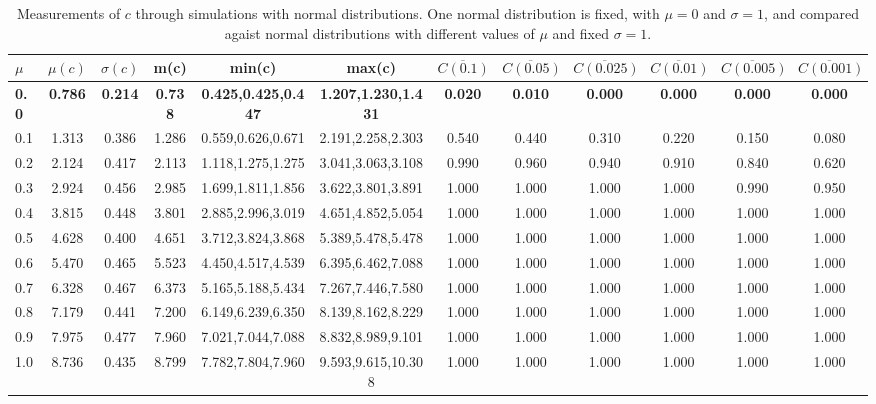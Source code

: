 \begin{table*}[h!]
\begin{center}
\begin{tabular}{| l | c | c | c | c | c | c | c | c | c | c | c |}\hline
$\mu$ & $\mu(c)$ & $\sigma(c)$ & m(c) & min(c) & max(c) & $\overline{C(0.1)}$ & $\overline{C(0.05)}$ & $\overline{C(0.025)}$ & $\overline{C(0.01)}$ & $\overline{C(0.005)}$ & $\overline{C(0.001)}$ \\\hline\hline
{\bf 0.0} & {\bf 0.786} & {\bf 0.214} & {\bf 0.738} & {\bf 0.425,0.425,0.447} & {\bf 1.207,1.230,1.431} & {\bf 0.020} & {\bf 0.010} & {\bf 0.000} & {\bf 0.000} & {\bf 0.000} & {\bf 0.000} \\\hline
0.1 & 1.313 & 0.386 & 1.286 & 0.559,0.626,0.671 & 2.191,2.258,2.303  & 0.540  & 0.440  & 0.310  & 0.220  & 0.150  & 0.080 \\\hline
0.2 & 2.124 & 0.417 & 2.113 & 1.118,1.275,1.275 & 3.041,3.063,3.108  & 0.990  & 0.960  & 0.940  & 0.910  & 0.840  & 0.620 \\\hline
0.3 & 2.924 & 0.456 & 2.985 & 1.699,1.811,1.856 & 3.622,3.801,3.891  & 1.000  & 1.000  & 1.000  & 1.000  & 0.990  & 0.950 \\\hline
0.4 & 3.815 & 0.448 & 3.801 & 2.885,2.996,3.019 & 4.651,4.852,5.054  & 1.000  & 1.000  & 1.000  & 1.000  & 1.000  & 1.000 \\\hline
0.5 & 4.628 & 0.400 & 4.651 & 3.712,3.824,3.868 & 5.389,5.478,5.478  & 1.000  & 1.000  & 1.000  & 1.000  & 1.000  & 1.000 \\\hline
0.6 & 5.470 & 0.465 & 5.523 & 4.450,4.517,4.539 & 6.395,6.462,7.088  & 1.000  & 1.000  & 1.000  & 1.000  & 1.000  & 1.000 \\\hline
0.7 & 6.328 & 0.467 & 6.373 & 5.165,5.188,5.434 & 7.267,7.446,7.580  & 1.000  & 1.000  & 1.000  & 1.000  & 1.000  & 1.000 \\\hline
0.8 & 7.179 & 0.441 & 7.200 & 6.149,6.239,6.350 & 8.139,8.162,8.229  & 1.000  & 1.000  & 1.000  & 1.000  & 1.000  & 1.000 \\\hline
0.9 & 7.975 & 0.477 & 7.960 & 7.021,7.044,7.088 & 8.832,8.989,9.101  & 1.000  & 1.000  & 1.000  & 1.000  & 1.000  & 1.000 \\\hline
1.0 & 8.736 & 0.435 & 8.799 & 7.782,7.804,7.960 & 9.593,9.615,10.308  & 1.000  & 1.000  & 1.000  & 1.000  & 1.000  & 1.000 \\\hline
\end{tabular}
\caption{Measurements of $c$ through simulations
        with normal distributions.
        One normal distribution is fixed, with $\mu=0$ and $\sigma=1$,
        and compared agaist normal distributions with different values of $\mu$ and fixed $\sigma=1$.}
\end{center}
\end{table*}